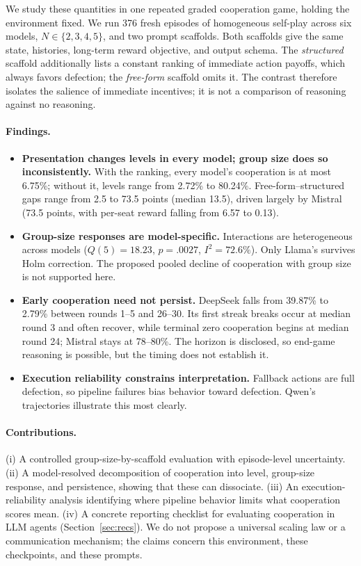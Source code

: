 \documentclass[11pt]{article}
\begin{document}
We study these quantities in one repeated graded cooperation game, holding the environment fixed. We run 376 fresh episodes of homogeneous self-play across six models, $N\in\{2,3,4,5\}$, and two prompt scaffolds. Both scaffolds give the same state, histories, long-term reward objective, and output schema. The \emph{structured} scaffold additionally lists a constant ranking of immediate action payoffs, which always favors defection; the \emph{free-form} scaffold omits it. The contrast therefore isolates the salience of immediate incentives; it is not a comparison of reasoning against no reasoning.

\paragraph{Findings.}
\begin{itemize}
\item \textbf{Presentation changes levels in every model; group size does so inconsistently.} With the ranking, every model's cooperation is at most 6.75\%; without it, levels range from 2.72\% to 80.24\%. Free-form--structured gaps range from 2.5 to 73.5 points (median 13.5), driven largely by Mistral (73.5 points, with per-seat reward falling from 6.57 to 0.13).

\item \textbf{Group-size responses are model-specific.} Interactions are heterogeneous across models ($Q(5)=18.23$, $p=.0027$, $I^2=72.6\%$). Only Llama's survives Holm correction. The proposed pooled decline of cooperation with group size is not supported here.
\item \textbf{Early cooperation need not persist.} DeepSeek falls from 39.87\% to 2.79\% between rounds 1--5 and 26--30. Its first streak breaks occur at median round 3 and often recover, while terminal zero cooperation begins at median round 24; Mistral stays at 78--80\%. The horizon is disclosed, so end-game reasoning is possible, but the timing does not establish it.
\item \textbf{Execution reliability constrains interpretation.} Fallback actions are full defection, so pipeline failures bias behavior toward defection. Qwen's trajectories illustrate this most clearly.
\end{itemize}

\paragraph{Contributions.} (i) A controlled group-size-by-scaffold evaluation with episode-level uncertainty. (ii) A model-resolved decomposition of cooperation into level, group-size response, and persistence, showing that these can dissociate. (iii) An execution-reliability analysis identifying where pipeline behavior limits what cooperation scores mean. (iv) A concrete reporting checklist for evaluating cooperation in LLM agents (Section~\ref{sec:recs}). We do not propose a universal scaling law or a communication mechanism; the claims concern this environment, these checkpoints, and these prompts.
\end{document}
